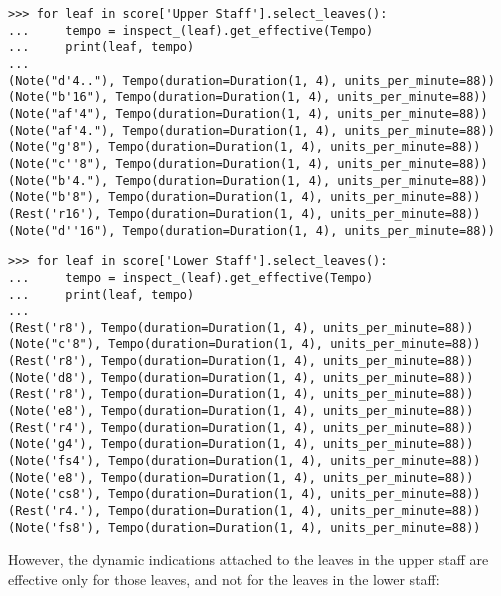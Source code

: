 \begin{abjadbookoutput}
\begin{singlespacing}
\vspace{-0.5\baselineskip}
\begin{lstlisting}
>>> for leaf in score['Upper Staff'].select_leaves():
...     tempo = inspect_(leaf).get_effective(Tempo)
...     print(leaf, tempo)
...
(Note("d'4.."), Tempo(duration=Duration(1, 4), units_per_minute=88))
(Note("b'16"), Tempo(duration=Duration(1, 4), units_per_minute=88))
(Note("af'4"), Tempo(duration=Duration(1, 4), units_per_minute=88))
(Note("af'4."), Tempo(duration=Duration(1, 4), units_per_minute=88))
(Note("g'8"), Tempo(duration=Duration(1, 4), units_per_minute=88))
(Note("c''8"), Tempo(duration=Duration(1, 4), units_per_minute=88))
(Note("b'4."), Tempo(duration=Duration(1, 4), units_per_minute=88))
(Note("b'8"), Tempo(duration=Duration(1, 4), units_per_minute=88))
(Rest('r16'), Tempo(duration=Duration(1, 4), units_per_minute=88))
(Note("d''16"), Tempo(duration=Duration(1, 4), units_per_minute=88))
\end{lstlisting}
\begin{lstlisting}
>>> for leaf in score['Lower Staff'].select_leaves():
...     tempo = inspect_(leaf).get_effective(Tempo)
...     print(leaf, tempo)
...
(Rest('r8'), Tempo(duration=Duration(1, 4), units_per_minute=88))
(Note("c'8"), Tempo(duration=Duration(1, 4), units_per_minute=88))
(Rest('r8'), Tempo(duration=Duration(1, 4), units_per_minute=88))
(Note('d8'), Tempo(duration=Duration(1, 4), units_per_minute=88))
(Rest('r8'), Tempo(duration=Duration(1, 4), units_per_minute=88))
(Note('e8'), Tempo(duration=Duration(1, 4), units_per_minute=88))
(Rest('r4'), Tempo(duration=Duration(1, 4), units_per_minute=88))
(Note('g4'), Tempo(duration=Duration(1, 4), units_per_minute=88))
(Note('fs4'), Tempo(duration=Duration(1, 4), units_per_minute=88))
(Note('e8'), Tempo(duration=Duration(1, 4), units_per_minute=88))
(Note('cs8'), Tempo(duration=Duration(1, 4), units_per_minute=88))
(Rest('r4.'), Tempo(duration=Duration(1, 4), units_per_minute=88))
(Note('fs8'), Tempo(duration=Duration(1, 4), units_per_minute=88))
\end{lstlisting}
\end{singlespacing}
\end{abjadbookoutput}

\noindent However, the dynamic indications attached to the leaves in the upper
staff are effective only for those leaves, and not for the leaves in the lower
staff:

